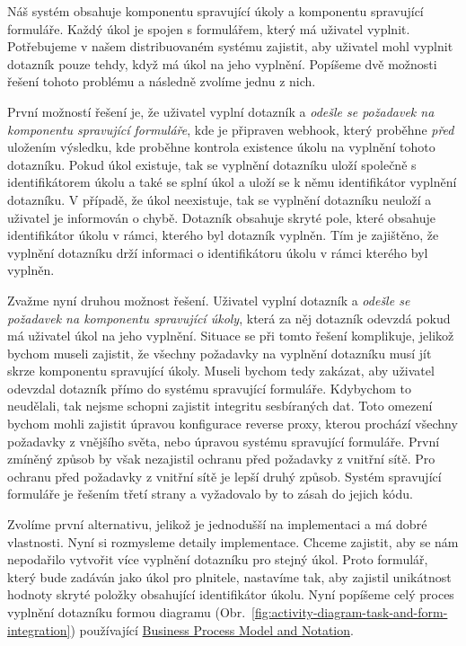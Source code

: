Náš systém obsahuje komponentu spravující úkoly a komponentu spravující formuláře.
Každý úkol je spojen s formulářem, který má uživatel vyplnit.
Potřebujeme v našem distribuovaném systému zajistit, aby uživatel mohl vyplnit dotazník pouze tehdy, když má úkol na jeho vyplnění.
Popíšeme dvě možnosti řešení tohoto problému a následně zvolíme jednu z nich.

První možností řešení je, že uživatel vyplní dotazník a \emph{odešle se požadavek na komponentu spravující formuláře}, kde je připraven webhook, který proběhne \emph{před} uložením výsledku, kde proběhne kontrola existence úkolu na vyplnění tohoto dotazníku.
Pokud úkol existuje, tak se vyplnění dotazníku uloží společně s identifikátorem úkolu a také se splní úkol a uloží se k němu identifikátor vyplnění dotazníku.
V případě, že úkol neexistuje, tak se vyplnění dotazníku neuloží a uživatel je informován o chybě.
Dotazník obsahuje skryté pole, které obsahuje identifikátor úkolu v rámci, kterého byl dotazník vyplněn.
Tím je zajištěno, že vyplnění dotazníku drží informaci o identifikátoru úkolu v rámci kterého byl vyplněn.

Zvažme nyní druhou možnost řešení.
Uživatel vyplní dotazník a \emph{odešle se požadavek na komponentu spravující úkoly}, která za něj dotazník odevzdá pokud má uživatel úkol na jeho vyplnění.
Situace se při tomto řešení komplikuje, jelikož bychom museli zajistit, že všechny požadavky na vyplnění dotazníku musí jít skrze komponentu spravující úkoly.
Museli bychom tedy zakázat, aby uživatel odevzdal dotazník přímo do systému spravující formuláře.
Kdybychom to neudělali, tak nejsme schopni zajistit integritu sesbíraných dat.
Toto omezení bychom mohli zajistit úpravou konfigurace reverse proxy, kterou prochází všechny požadavky z vnějšího světa, nebo úpravou systému spravující formuláře.
První zmíněný způsob by však nezajistil ochranu před požadavky z vnitřní sítě.
Pro ochranu před požadavky z vnitřní sítě je lepší druhý způsob.
Systém spravující formuláře je řešením třetí strany a vyžadovalo by to zásah do jejich kódu.

Zvolíme první alternativu, jelikož je jednodušší na implementaci a má dobré vlastnosti.
Nyní si rozmysleme detaily implementace.
Chceme zajistit, aby se nám nepodařilo vytvořit více vyplnění dotazníku pro stejný úkol.
Proto formulář, který bude zadáván jako úkol pro plnitele, nastavíme tak, aby zajistil unikátnost hodnoty skryté položky obsahující identifikátor úkolu.
Nyní popíšeme celý proces vyplnění dotazníku formou diagramu (Obr.~\ref{fig:activity-diagram-task-and-form-integration}) používající \href{https://www.bpmn.org/}{Business Process Model and Notation}.

